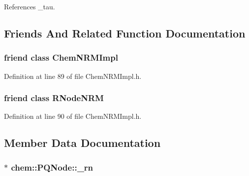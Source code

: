 References \-\_\-tau.



\subsection{Friends And Related Function Documentation}
\hypertarget{classchem_1_1PQNode_a6dae39f8dddcdbda9b4f6a1c1bf1bda8}{
\subsubsection[{Chem\-N\-R\-M\-Impl}]{\setlength{\rightskip}{0pt plus 5cm}friend class {\bf Chem\-N\-R\-M\-Impl}}}\label{classchem_1_1PQNode_a6dae39f8dddcdbda9b4f6a1c1bf1bda8}


Definition at line 89 of file Chem\-N\-R\-M\-Impl.\-h.

\hypertarget{classchem_1_1PQNode_a9dfcd0d41325e8ca108cba1768ebab89}{
\subsubsection[{R\-Node\-N\-R\-M}]{\setlength{\rightskip}{0pt plus 5cm}friend class {\bf R\-Node\-N\-R\-M}}}\label{classchem_1_1PQNode_a9dfcd0d41325e8ca108cba1768ebab89}


Definition at line 90 of file Chem\-N\-R\-M\-Impl.\-h.



\subsection{Member Data Documentation}
\hypertarget{classchem_1_1PQNode_ae0ddd94f908ec800ae02f592e83c630d}{
\subsubsection[{\-\_\-rn}]{$\ast$ {\bf chem\-::\-P\-Q\-Node\-::\-\_\-rn}}}\label{classchem_1_1PQNode_ae0ddd94f908ec800ae02f592e83c630d}


